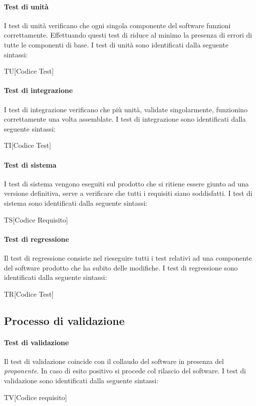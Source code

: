 \paragraph{Test di unità}
I test di unità verificano che ogni singola componente del software funzioni
correttamente. Effettuando questi test di riduce al minimo la presenza di errori
di tutte le componenti di base. I test di unità sono identificati dalla seguente
sintassi:
\begin{center}
  TU[Codice Test]
\end{center}
\paragraph{Test di integrazione}
I test di integrazione verificano che più unità, validate singolarmente, funzionino
correttamente una volta assemblate. I test di integrazione sono identificati
dalla seguente sintassi:
\begin{center}
  TI[Codice Test]
\end{center}
\paragraph{Test di sistema}
I test di sistema vengono eseguiti sul prodotto che si ritiene essere giunto ad
una versione definitiva, serve a verificare che tutti i requisiti siano
soddisfatti. I test di sistema sono identificati dalla seguente sintassi:
\begin{center}
  TS[Codice Requisito]
\end{center}
\paragraph{Test di regressione}
Il test di regressione consiste nel rieseguire tutti i test relativi ad una
componente del software prodotto che ha subito delle modifiche. I test di
regressione sono identificati dalla seguente sintassi:
\begin{center}
  TR[Codice Test]
\end{center}

\subsection{Processo di validazione}
\paragraph{Test di validazione}
Il test di validazione coincide con il collaudo del software in presenza del
\textit{proponente}. In caso di esito positivo si procede col rilascio del
software. I test di validazione sono identificati dalla seguente sintassi:
\begin{center}
	TV[Codice requisito]
\end{center}

